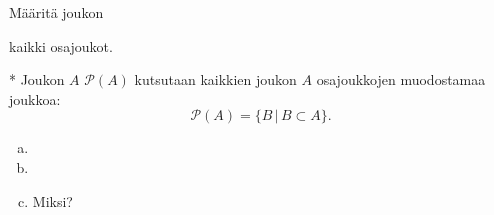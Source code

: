 \begin{tehtava}
     Määritä joukon
    \begin{alakohdat}
    \end{alakohdat}
kaikki osajoukot.
    \begin{vastaus}
    
        \begin{alakohdat}

        \end{alakohdat}
    \end{vastaus}
    
\end{tehtava}

\begin{tehtava}
*
Joukon $A$  $\mathcal{P}(A)$ kutsutaan kaikkien joukon $A$ osajoukkojen muodostamaa joukkoa:
\[
\mathcal{P}(A)=\{ B \, | \, B\subset A\}.
\]
    \begin{alakohdat}
    \end{alakohdat}

    \begin{vastaus}
    
        \begin{alakohdat}
            \alakohta{$\{ \emptyset\}$}
            \alakohta{$\{\emptyset, \{\emptyset\} \}$}
        \end{alakohdat}
    \end{vastaus}
    
\end{tehtava}

\item 
\begin{enumerate}[a)]
\item 
\item 
\item  Miksi?
\end{enumerate}

